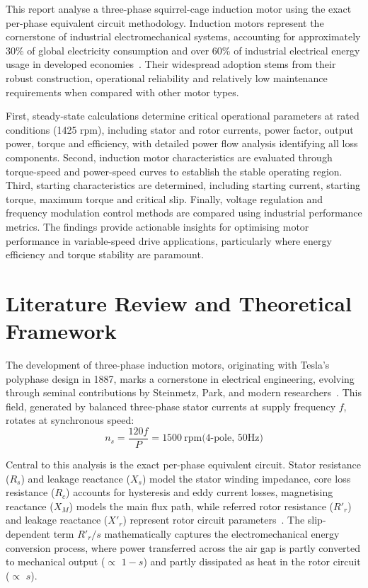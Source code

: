 \documentclass[a4paper,12pt]{IEEEtran}
\begin{document}
This report analyse a three-phase squirrel-cage induction motor using the exact per-phase equivalent circuit methodology. Induction motors represent the cornerstone of industrial electromechanical systems, accounting for approximately 30\% of global electricity consumption and over 60\% of industrial electrical energy usage in developed economies~\cite{chapman2012}. Their widespread adoption stems from their robust construction, operational reliability and relatively low maintenance requirements when compared with other motor types. 

First, steady-state calculations determine critical operational parameters at rated conditions (1425 rpm), including stator and rotor currents, power factor, output power, torque and efficiency, with detailed power flow analysis identifying all loss components. Second, induction motor characteristics are evaluated through torque-speed and power-speed curves to establish the stable operating region. Third, starting characteristics are determined, including starting current, starting torque, maximum torque and critical slip. Finally, voltage regulation and frequency modulation control methods are compared using industrial performance metrics. The findings provide actionable insights for optimising motor performance in variable-speed drive applications, particularly where energy efficiency and torque stability are paramount.  
 
 

 \section{Literature Review and Theoretical Framework}

The development of three-phase induction motors, originating with Tesla’s polyphase design in 1887, marks a cornerstone in electrical engineering, evolving through seminal contributions by Steinmetz, Park, and modern researchers~\cite{fitzgerald2020}. This field, generated by balanced three-phase stator currents at supply frequency \( f \), rotates at synchronous speed:
\begin{equation}
n_s =\frac{120f}{P}=1500~\text{rpm} \text{(4-pole, 50Hz)}
\end{equation}

Central to this analysis is the exact per-phase equivalent circuit. Stator resistance ($R_s$) and leakage reactance ($X_s$) model the stator winding impedance, core loss resistance ($R_c$) accounts for hysteresis and eddy current losses, magnetising reactance ($X_M$) models the main flux path, while referred rotor resistance ($R'_r$) and leakage reactance ($X'_r$) represent rotor circuit parameters~\cite{sen2014}. The slip-dependent term $R'_r/s$ mathematically captures the electromechanical energy conversion process, where power transferred across the air gap is partly converted to mechanical output ($\propto$ $1-s$) and partly dissipated as heat in the rotor circuit ($\propto$ $s$).
\end{document}
